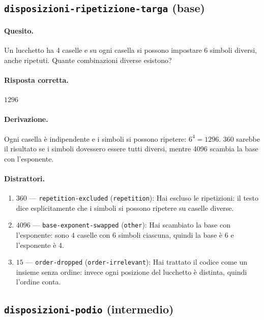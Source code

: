 \subsection{\texorpdfstring{\texttt{disposizioni-ripetizione-targa} (base)}{disposizioni-ripetizione-targa (base)}}

\paragraph{Quesito.} Un lucchetto ha 4 caselle e su ogni casella si possono impostare 6 simboli diversi, anche ripetuti. Quante combinazioni diverse esistono?

\paragraph{Risposta corretta.} $1296$

\paragraph{Derivazione.} Ogni casella è indipendente e i simboli si possono ripetere: $6^{4} = 1296$. 360 sarebbe il risultato se i simboli dovessero essere tutti diversi, mentre 4096 scambia la base con l'esponente.

\paragraph{Distrattori.}
\begin{enumerate}
  \item $360$ --- \texttt{repetition-excluded} (\texttt{repetition}): Hai escluso le ripetizioni: il testo dice esplicitamente che i simboli si possono ripetere su caselle diverse.
  \item $4096$ --- \texttt{base-exponent-swapped} (\texttt{other}): Hai scambiato la base con l'esponente: sono 4 caselle con 6 simboli ciascuna, quindi la base è 6 e l'esponente è 4.
  \item $15$ --- \texttt{order-dropped} (\texttt{order-irrelevant}): Hai trattato il codice come un insieme senza ordine: invece ogni posizione del lucchetto è distinta, quindi l'ordine conta.
\end{enumerate}

\subsection{\texorpdfstring{\texttt{disposizioni-podio} (intermedio)}{disposizioni-podio (intermedio)}}

